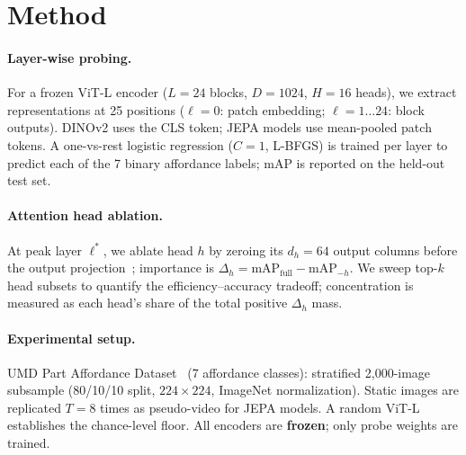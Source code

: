 \section{Method}
\label{sec:method}

\paragraph{Layer-wise probing.}
For a frozen ViT-L encoder ($L{=}24$ blocks, $D{=}1024$, $H{=}16$ heads), we extract
representations at 25 positions ($\ell{=}0$: patch embedding; $\ell{=}1\ldots24$: block outputs).
DINOv2 uses the CLS token; JEPA models use mean-pooled patch tokens.
A one-vs-rest logistic regression ($C{=}1$, L-BFGS) is trained per layer to predict each of the
7 binary affordance labels; mAP is reported on the held-out test set.

\paragraph{Attention head ablation.}
At peak layer $\ell^*$, we ablate head $h$ by zeroing its $d_h{=}64$ output columns before
the output projection~\cite{michel2019sixteen}; importance is
$\Delta_h = \text{mAP}_\text{full} - \text{mAP}_{-h}$.
We sweep top-$k$ head subsets to quantify the efficiency--accuracy tradeoff; concentration is measured as each head's share of the total positive $\Delta_h$ mass.

\paragraph{Experimental setup.}
UMD Part Affordance Dataset~\cite{myers2015affordance} (7 affordance classes): stratified 2,000-image subsample
(80/10/10 split, $224{\times}224$, ImageNet normalization).
Static images are replicated $T{=}8$ times as pseudo-video for JEPA models.
A random ViT-L establishes the chance-level floor.
All encoders are \textbf{frozen}; only probe weights are trained.

